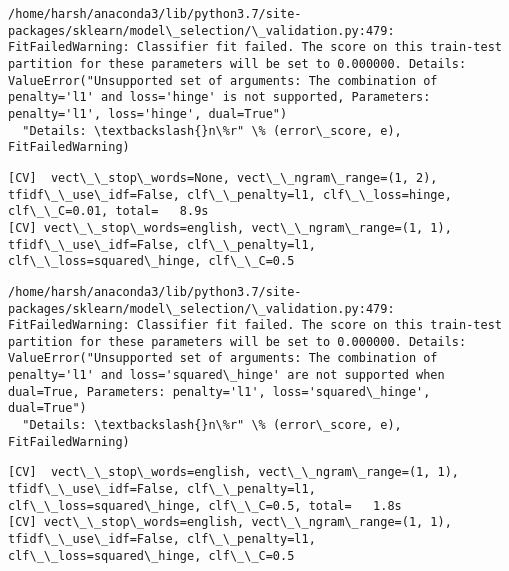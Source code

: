 \documentclass[11pt]{article}
\begin{document}
    \begin{Verbatim}[commandchars=\\\{\}]
/home/harsh/anaconda3/lib/python3.7/site-packages/sklearn/model\_selection/\_validation.py:479: FitFailedWarning: Classifier fit failed. The score on this train-test partition for these parameters will be set to 0.000000. Details: 
ValueError("Unsupported set of arguments: The combination of penalty='l1' and loss='hinge' is not supported, Parameters: penalty='l1', loss='hinge', dual=True")
  "Details: \textbackslash{}n\%r" \% (error\_score, e), FitFailedWarning)

    \end{Verbatim}

    \begin{Verbatim}[commandchars=\\\{\}]
[CV]  vect\_\_stop\_words=None, vect\_\_ngram\_range=(1, 2), tfidf\_\_use\_idf=False, clf\_\_penalty=l1, clf\_\_loss=hinge, clf\_\_C=0.01, total=   8.9s
[CV] vect\_\_stop\_words=english, vect\_\_ngram\_range=(1, 1), tfidf\_\_use\_idf=False, clf\_\_penalty=l1, clf\_\_loss=squared\_hinge, clf\_\_C=0.5 

    \end{Verbatim}

    \begin{Verbatim}[commandchars=\\\{\}]
/home/harsh/anaconda3/lib/python3.7/site-packages/sklearn/model\_selection/\_validation.py:479: FitFailedWarning: Classifier fit failed. The score on this train-test partition for these parameters will be set to 0.000000. Details: 
ValueError("Unsupported set of arguments: The combination of penalty='l1' and loss='squared\_hinge' are not supported when dual=True, Parameters: penalty='l1', loss='squared\_hinge', dual=True")
  "Details: \textbackslash{}n\%r" \% (error\_score, e), FitFailedWarning)

    \end{Verbatim}

    \begin{Verbatim}[commandchars=\\\{\}]
[CV]  vect\_\_stop\_words=english, vect\_\_ngram\_range=(1, 1), tfidf\_\_use\_idf=False, clf\_\_penalty=l1, clf\_\_loss=squared\_hinge, clf\_\_C=0.5, total=   1.8s
[CV] vect\_\_stop\_words=english, vect\_\_ngram\_range=(1, 1), tfidf\_\_use\_idf=False, clf\_\_penalty=l1, clf\_\_loss=squared\_hinge, clf\_\_C=0.5 

    \end{Verbatim}
\end{document}
